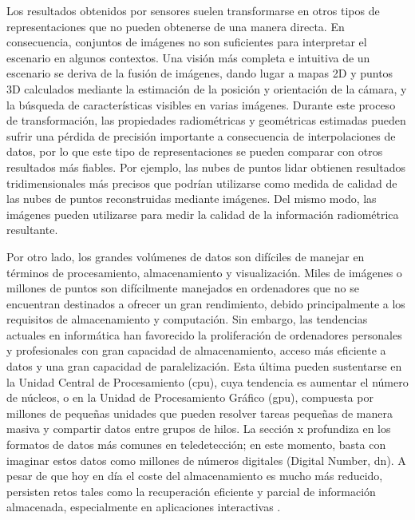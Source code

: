 Los resultados obtenidos por sensores suelen transformarse en otros tipos de representaciones que no pueden obtenerse de una manera directa. En consecuencia, conjuntos de imágenes no son suficientes para interpretar el escenario en algunos contextos. Una visión más completa e intuitiva de un escenario se deriva de la fusión de imágenes, dando lugar a mapas 2D y puntos 3D calculados mediante la estimación de la posición y orientación de la cámara, y la búsqueda de características visibles en varias imágenes. Durante este proceso de transformación, las propiedades radiométricas y geométricas estimadas pueden sufrir una pérdida de precisión importante a consecuencia de interpolaciones de datos, por lo que este tipo de representaciones se pueden comparar con otros resultados más fiables. Por ejemplo, las nubes de puntos \acrshort{lidar} obtienen resultados tridimensionales más precisos que podrían utilizarse como medida de calidad de las nubes de puntos reconstruidas mediante imágenes. Del mismo modo, las imágenes pueden utilizarse para medir la calidad de la información radiométrica resultante.   

Por otro lado, los grandes volúmenes de datos son difíciles de manejar en términos de procesamiento, almacenamiento y visualización. Miles de imágenes o millones de puntos son difícilmente manejados en ordenadores que no se encuentran destinados a ofrecer un gran rendimiento, debido principalmente a los requisitos de almacenamiento y computación. Sin embargo, las tendencias actuales en informática han favorecido la proliferación de ordenadores personales y profesionales con gran capacidad de almacenamiento, acceso más eficiente a datos y una gran capacidad de paralelización. Esta última pueden sustentarse en la Unidad Central de Procesamiento (\acrshort{cpu}), cuya tendencia es aumentar el número de núcleos, o en la Unidad de Procesamiento Gráfico (\acrshort{gpu}), compuesta por millones de pequeñas unidades que pueden resolver tareas pequeñas de manera masiva y compartir datos entre grupos de hilos. La sección x profundiza en los formatos de datos más comunes en teledetección; en este momento, basta con imaginar estos datos como millones de números digitales (Digital Number, \acrshort{dn}). A pesar de que hoy en día el coste del almacenamiento es mucho más reducido, persisten retos tales como la recuperación eficiente y parcial de información almacenada, especialmente en aplicaciones interactivas \cite{bejar-martos_strategies_2022, ogayar-anguita_nested_2023}. 

